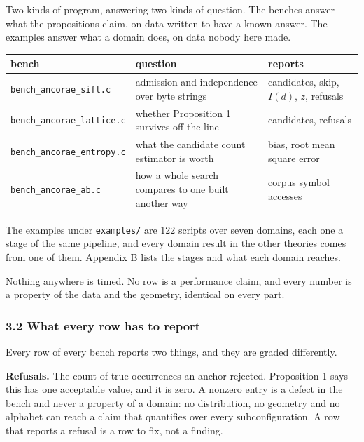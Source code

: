 Two kinds of program, answering two kinds of question. The benches answer what the propositions
claim, on data written to have a known answer. The examples answer what a domain does, on data
nobody here made.

\begin{center}
\begin{tabular}{@{}>{\raggedright\arraybackslash}p{}>{\raggedright\arraybackslash}p{}>{\raggedright\arraybackslash}p{}@{}}
\toprule
bench & question & reports \\
\midrule
\texttt{bench\_ancorae\_sift.c} &
  admission and independence over byte strings &
  candidates, skip, \(I(d)\), \(z\), refusals \\
\addlinespace[0.4em]
\texttt{bench\_\allowbreak{}ancorae\_\allowbreak{}lattice.\allowbreak{}c} &
  whether Proposition 1 survives off the line &
  candidates, refusals \\
\addlinespace[0.4em]
\texttt{bench\_\allowbreak{}ancorae\_\allowbreak{}entropy.\allowbreak{}c} &
  what the candidate count estimator is worth &
  bias, root mean square error \\
\addlinespace[0.4em]
\texttt{bench\_ancorae\_ab.c} &
  how a whole search compares to one built another way &
  corpus symbol accesses \\
\bottomrule
\end{tabular}
\end{center}

The examples under \texttt{examples/\allowbreak{}} are 122 scripts over seven domains, each one a stage of the same pipeline, and every domain result in the other theories comes from one of them. Appendix B lists the stages and what each domain reaches.

Nothing anywhere is timed. No row is a performance claim, and every number is a property of the
data and the geometry, identical on every part.

\subsubsection{3.2 What every row has to report}

Every row of every bench reports two things, and they are graded differently.

\noindent\textbf{Refusals.} The count of true occurrences an anchor rejected. Proposition 1 says this has one
acceptable value, and it is zero. A nonzero entry is a defect in the bench and never a property of
a domain: no distribution, no geometry and no alphabet can reach a claim that quantifies over every
subconfiguration. A row that reports a refusal is a row to fix, not a finding.

